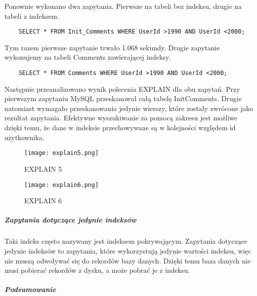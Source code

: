 Ponownie wykonano dwa zapytania. Pierwsze na tabeli bez indeksu, drugie na tabeli z indeksem.
\begin{verbatim}
    SELECT * FROM Init_Comments WHERE UserId >1990 AND UserId <2000;
\end{verbatim}

Tym razem pierwsze zapytanie trwało 1.068 sekundy. Drugie zapytanie wykonujemy na tabeli Comments zawierającej indeksy.
\begin{verbatim}
    SELECT * FROM Comments WHERE UserId >1990 AND UserId <2000;
\end{verbatim}
Następnie przeanalizowano wynik polecenia EXPLAIN dla obu zapytań. Przy pierwszym zapytaniu MySQL przeskanował całą tabelę Init\textunderscore Comments. Drugie natomiast wymagało przeskanowania jedynie wierszy, które zostały zwrócone jako rezultat zapytania.
Efektywne wyszukiwanie za pomocą zakresu jest możliwe dzięki temu, że dane w indeksie przechowywane są w kolejności względem id użytkownika.
\begin{figure}[h]
    \texttt{[image: explain5.png]} 
    \caption{EXPLAIN 5}
\end{figure}

\begin{figure}[h]
    \texttt{[image: explain6.png]} 
    \caption{EXPLAIN 6}
\end{figure}



\subparagraph{Zapytania dotyczące jedynie indeksów}\mbox{} \newline
Taki indeks często nazywany jest indeksem pokrywającym. Zapytania dotyczące jedynie indeksów to zapytania, które wykorzystują jedynie wartości indeksu, więc nie muszą odwoływać się do rekordów bazy danych. Dzięki temu baza danych nie musi pobierać rekordów z dysku, a może pobrać je z indeksu.


\subparagraph{Podsumowanie}\mbox{} \newline


